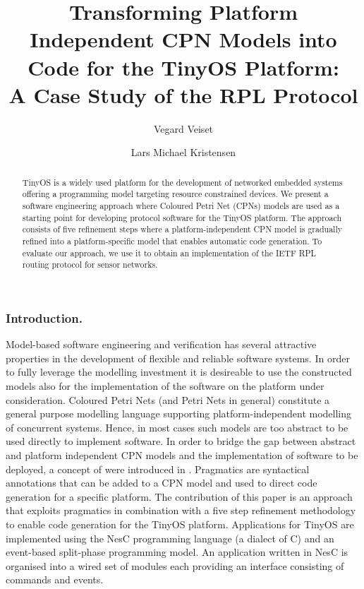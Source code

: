 \documentclass{llncs}
\title{Transforming Platform Independent CPN Models into Code for the TinyOS
  Platform: \\ A Case Study of the RPL Protocol}
\author{
  Vegard Veiset \and Lars Michael Kristensen
}
\institute{
  Department of Computing, Bergen University College \\
  Email: \email{vegard.veiset@stud.hib.no,lmkr@hib.no}
}
\begin{document}
\maketitle

\begin{abstract}

TinyOS is a widely used platform for the development of networked
embedded systems offering a programming model targeting resource
constrained devices. We present a software engineering approach where
Coloured Petri Net (CPNs) models are used as a starting point for
developing protocol software for the TinyOS platform. The approach
consists of five refinement steps where a platform-independent CPN
model is gradually refined into a platform-specific model that enables
automatic code generation. To evaluate our approach, we use it to
obtain an implementation of the IETF RPL routing protocol for sensor
networks.


\end{abstract}

\subsubsection{Introduction.} Model-based software engineering and verification  has several attractive properties in the development of flexible and reliable
software systems. In order to fully leverage the modelling investment
it is desireable to use the constructed models also for the
implementation of the software on the platform under
consideration. Coloured Petri Nets \cite{CPNsttt} (and Petri Nets in
general) constitute a general purpose modelling language supporting
platform-independent modelling of concurrent systems. Hence, in most
cases such models are too abstract to be used directly to implement
software. In order to bridge the gap between abstract and platform
independent CPN models and the implementation of software to be
deployed, a concept of  were introduced in
\cite{NWPTpaper}. Pragmatics are syntactical annotations that can be
added to a CPN model and used to direct code generation for a specific
platform. The contribution of this paper is an approach
\cite{veisetthesis} that exploits pragmatics in combination with a
five step refinement methodology to enable code generation for the
TinyOS platform. Applications for TinyOS \cite{LevisTinyOS} are
implemented using the NesC programming language (a dialect of C) and
an event-based split-phase programming model. An application written
in NesC is organised into a wired set of modules each providing an
interface consisting of commands and events.
\end{document}
